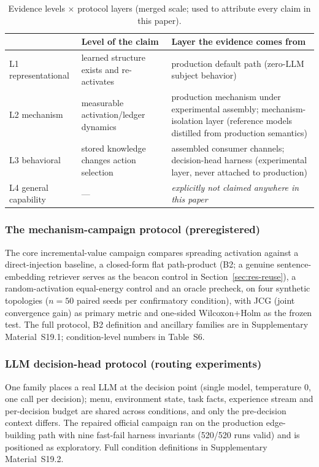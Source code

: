 \documentclass[10pt]{article}
\begin{document}
\begin{table}[t]
\centering\small
\caption{Evidence levels $\times$ protocol layers (merged scale; used to attribute every claim in this paper).}
\label{tab:evidence}
\begin{tabular}{L{3.2cm}L{4.4cm}L{6.3cm}}
\toprule
 & \textbf{Level of the claim} & \textbf{Layer the evidence comes from} \\
\midrule
L1 representational & learned structure exists and re-activates & production default path (zero-LLM subject behavior) \\
L2 mechanism & measurable activation/ledger dynamics & production mechanism under experimental assembly; mechanism-isolation layer (reference models distilled from production semantics) \\
L3 behavioral & stored knowledge changes action selection & assembled consumer channels; decision-head harness (experimental layer, never attached to production) \\
L4 general capability & --- & \emph{explicitly not claimed anywhere in this paper} \\
\bottomrule
\end{tabular}
\end{table}

\subsubsection{The mechanism-campaign protocol (preregistered)}
\label{sec:method-civ}
The core incremental-value campaign compares spreading activation against a direct-injection baseline, a closed-form flat path-product (B2; a genuine sentence-embedding retriever serves as the beacon control in Section~\ref{sec:res-reuse}), a random-activation equal-energy control and an oracle precheck, on four synthetic topologies ($n{=}50$ paired seeds per confirmatory condition), with JCG (joint convergence gain) as primary metric and one-sided Wilcoxon{+}Holm as the frozen test. The full protocol, B2 definition and ancillary families are in Supplementary Material~S19.1; condition-level numbers in Table~S6.

\subsubsection{LLM decision-head protocol (routing experiments)}
\label{sec:method-routing}
One family places a real LLM at the decision point (single model, temperature 0, one call per decision); menu, environment state, task facts, experience stream and per-decision budget are shared across conditions, and only the pre-decision context differs. The repaired official campaign ran on the production edge-building path with nine fast-fail harness invariants (520/520 runs valid) and is positioned as exploratory. Full condition definitions in Supplementary Material~S19.2.
\end{document}
